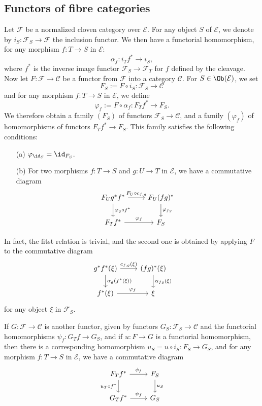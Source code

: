 \subsection{Functors of fibre categories}
Let $\mathcal{F}$ be a normalized cloven category over $\mathcal{E}$. For any object $S$ of $\mathcal{E}$, we denote by $i_S:\mathcal{F}_S\to \mathcal{F}$ the inclusion functor. We then have a functorial homomorphism, for any morphism $f:T\to S$ in $\mathcal{E}$:
\[\alpha_f:i_Tf^*\to i_S,\]
where $f^*$ is the inverse image functor $\mathcal{F}_S\to \mathcal{F}_T$ for $f$ defined by the cleavage. Now let $F:\mathcal{F}\to \mathcal{C}$ be a functor from $\mathcal{F}$ into a category $\mathcal{C}$. For $S\in\Ob(\mathcal{E})$, we set
\[F_S:=F\circ i_S:\mathcal{F}_S\to \mathcal{C}\]
and for any morphism $f:T\to S$ in $\mathcal{E}$, we define
\[\varphi_f:=F\circ\alpha_f:F_Tf^*\to F_S.\]
We therefore obtain a family $(F_S)$ of functors $\mathcal{F}_S\to \mathcal{C}$, and a family $(\varphi_f)$ of homomorphisms of functors $F_Tf^*\to F_S$. This family satisfies the following conditions:
\begin{enumerate}
\item[(a)] $\varphi_{\id_S}=\id_{F_S}$.
\item[(b)] For two morphisms $f:T\to S$ and $g:U\to T$ in $\mathcal{E}$, we have a commutative diagram
\[\begin{tikzcd}
F_Ug^*f^*\ar[r,"F_U\circ c_{f,g}"]\ar[d,"\varphi_g\circ f^*"]&F_U(fg)^*\ar[d,"\varphi_{fg}"]\\
F_Tf^*\ar[r,"\varphi_f"]&F_S
\end{tikzcd}\]
\end{enumerate}
In fact, the fitst relation is trivial, and the second one is obtained by applying $F$ to the commutative diagram
\[\begin{tikzcd}
g^*f^*(\xi)\ar[r,"c_{f,g}(\xi)"]\ar[d,"\alpha_g(f^*(\xi))"]&(fg)^*(\xi)\ar[d,"\alpha_{fg}(\xi)"]\\
f^*(\xi)\ar[r,"\varphi_f"]&\xi
\end{tikzcd}\]
for any object $\xi$ in $\mathcal{F}_S$.\par
If $G:\mathcal{F}\to \mathcal{C}$ is another functor, given by functors $G_S:\mathcal{F}_S\to \mathcal{C}$ and the functorial homomorphisms $\psi_f:G_Tf\to G_S$, and if $u:F\to G$ is a functorial homomorphism, then there is a corresponding homomorphism $u_S=u\circ i_S:F_S\to G_S$, and for any morphism $f:T\to S$ in $\mathcal{E}$, we have a commutative diagram
\begin{equation}\label{fibre cat functor diagram-1}
\begin{tikzcd}
F_Tf^*\ar[r,"\phi_f"]\ar[d,swap,"u_T\circ f^*"]&F_S\ar[d,"u_S"]\\
G_Tf^*\ar[r,"\psi_f"]&G_S
\end{tikzcd}
\end{equation}

